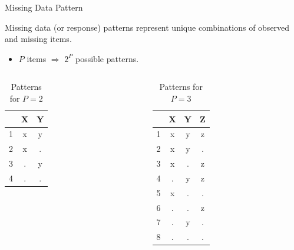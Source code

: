 \documentclass{beamer}\usepackage[]{graphicx}\usepackage[]{color}
\begin{document}
\begin{frame}{Missing Data Pattern}



Missing data (or response) patterns represent unique combinations of observed
and missing items.
\begin{itemize}
  \item $P$ items $\Rightarrow$ $2^P$ possible patterns.
\end{itemize}

\begin{columns}
  \begin{column}{0.45\textwidth}

\begin{table}[ht]
\centering
\begin{tabular}{ccc}
  \toprule
 & X & Y \\ 
  \midrule
1 & x & y \\ 
  2 & x & . \\ 
  3 & . & y \\ 
  4 & . & . \\ 
   \bottomrule
\end{tabular}
\caption{Patterns for $P = 2$} 
\end{table}


  \end{column}
  \begin{column}{0.45\textwidth}
\begin{table}[ht]
\centering
\begin{tabular}{cccc}
  \toprule
 & X & Y & Z \\ 
  \midrule
1 & x & y & z \\ 
  2 & x & y & . \\ 
  3 & x & . & z \\ 
  4 & . & y & z \\ 
  5 & x & . & . \\ 
  6 & . & . & z \\ 
  7 & . & y & . \\ 
  8 & . & . & . \\ 
   \bottomrule
\end{tabular}
\caption{Patterns for $P = 3$} 
\end{table}


    \end{column}
  \end{columns}

\end{frame}
\end{document}
